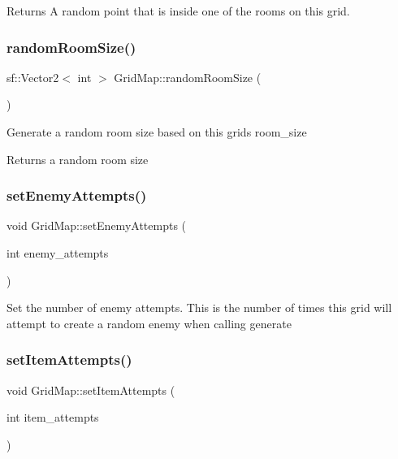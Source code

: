 \begin{DoxyReturn}{Returns}
A random point that is inside one of the rooms on this grid. 
\end{DoxyReturn}
\mbox{\label{classGridMap_af4625367cc720a2c101ea238ffd79644}} 
\subsubsection{\texorpdfstring{random\+Room\+Size()}{randomRoomSize()}}
{\footnotesize\ttfamily sf\+::\+Vector2$<$ int $>$ Grid\+Map\+::random\+Room\+Size (\begin{DoxyParamCaption}{ }\end{DoxyParamCaption})}

Generate a random room size based on this grid\textquotesingle{}s room\+\_\+size

\begin{DoxyReturn}{Returns}
a random room size 
\end{DoxyReturn}
\mbox{\label{classGridMap_a5b8801061a33e42d0aa4a2eac05506a5}} 
\subsubsection{\texorpdfstring{set\+Enemy\+Attempts()}{setEnemyAttempts()}}
{\footnotesize\ttfamily void Grid\+Map\+::set\+Enemy\+Attempts (\begin{DoxyParamCaption}\item[{int}]{enemy\+\_\+attempts }\end{DoxyParamCaption})}

Set the number of enemy attempts. This is the number of times this grid will attempt to create a random enemy when calling generate \mbox{\label{classGridMap_aef7fc3dcf541dbffa9e0a478790a0beb}} 
\subsubsection{\texorpdfstring{set\+Item\+Attempts()}{setItemAttempts()}}
{\footnotesize\ttfamily void Grid\+Map\+::set\+Item\+Attempts (\begin{DoxyParamCaption}\item[{int}]{item\+\_\+attempts }\end{DoxyParamCaption})}

